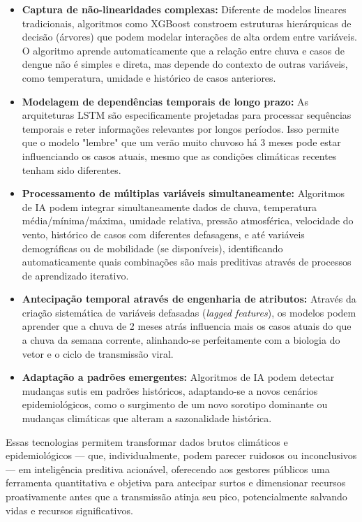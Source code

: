 \begin{itemize}
    \item \textbf{Captura de não-linearidades complexas:} Diferente de modelos lineares tradicionais, algoritmos como XGBoost constroem estruturas hierárquicas de decisão (árvores) que podem modelar interações de alta ordem entre variáveis. O algoritmo aprende automaticamente que a relação entre chuva e casos de dengue não é simples e direta, mas depende do contexto de outras variáveis, como temperatura, umidade e histórico de casos anteriores.
    
    \item \textbf{Modelagem de dependências temporais de longo prazo:} As arquiteturas LSTM são especificamente projetadas para processar sequências temporais e reter informações relevantes por longos períodos. Isso permite que o modelo "lembre" que um verão muito chuvoso há 3 meses pode estar influenciando os casos atuais, mesmo que as condições climáticas recentes tenham sido diferentes.
    
    \item \textbf{Processamento de múltiplas variáveis simultaneamente:} Algoritmos de IA podem integrar simultaneamente dados de chuva, temperatura média/mínima/máxima, umidade relativa, pressão atmosférica, velocidade do vento, histórico de casos com diferentes defasagens, e até variáveis demográficas ou de mobilidade (se disponíveis), identificando automaticamente quais combinações são mais preditivas através de processos de aprendizado iterativo.
    
    \item \textbf{Antecipação temporal através de engenharia de atributos:} Através da criação sistemática de variáveis defasadas (\textit{lagged features}), os modelos podem aprender que a chuva de 2 meses atrás influencia mais os casos atuais do que a chuva da semana corrente, alinhando-se perfeitamente com a biologia do vetor e o ciclo de transmissão viral.
    
    \item \textbf{Adaptação a padrões emergentes:} Algoritmos de IA podem detectar mudanças sutis em padrões históricos, adaptando-se a novos cenários epidemiológicos, como o surgimento de um novo sorotipo dominante ou mudanças climáticas que alteram a sazonalidade histórica.
\end{itemize}

Essas tecnologias permitem transformar dados brutos climáticos e epidemiológicos — que, individualmente, podem parecer ruidosos ou inconclusivos — em inteligência preditiva acionável, oferecendo aos gestores públicos uma ferramenta quantitativa e objetiva para antecipar surtos e dimensionar recursos proativamente antes que a transmissão atinja seu pico, potencialmente salvando vidas e recursos significativos.

